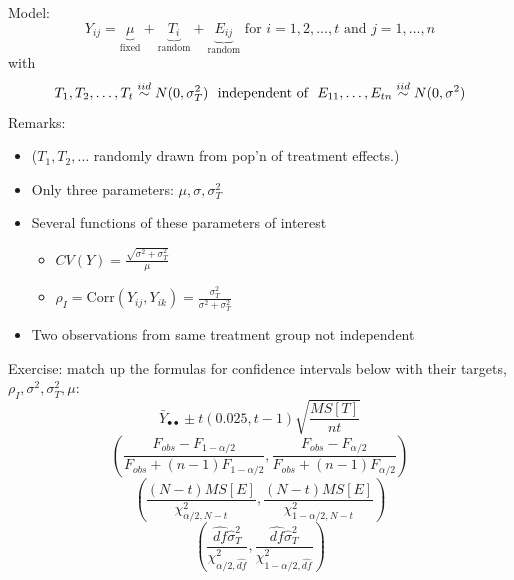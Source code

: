 Model:
$$ Y_{ij} = \underbrace{\mu}_{\text{fixed}} + \underbrace{T_i}_{\text{random}} 
+ \underbrace{E_{ij}}_{\text{random}} \text{ for }i=1,2,\ldots,t\mbox{ and }
j=1,\ldots,n$$
with
$$T_1,T_2,\ldots,T_t \stackrel{iid}{\sim} N(0,\sigma_T^2)\ \mbox{ independent of }\ E_{11},\ldots,E_{tn} \stackrel{iid}{\sim} N(0,\sigma^2)$$
\bigkn
Remarks:
\begin{itemize}
\item
($T_1,T_2,\ldots$ randomly drawn from pop'n of treatment
effects.)
\item Only three parameters: $\mu,\sigma,\sigma_T^2$
\item Several functions of these parameters of interest
\begin{itemize}
\item $CV(Y)=\frac{\sqrt{\sigma^2 + \sigma_T^2}}{\mu}$
\item $\rho_I=\mbox{Corr}(Y_{ij},Y_{ik})=\frac{\sigma_T^2}{\sigma^2 + \sigma_T^2}$
\end{itemize}
\item Two observations from same treatment group not independent
\end{itemize}
Exercise: match up the formulas for confidence intervals
below with their targets, $\rho_I,\sigma^2,\sigma_T^2,\mu$: 
$$\bar{Y}_{\bullet\bullet} \pm t(0.025,t-1) \sqrt{\frac{MS[T]}{nt}}$$
$$\left(\frac{F_{obs}-F_{1-\alpha/2}}{F_{obs}+(n-1)F_{1-\alpha/2}},\frac{F_{obs}-F_{\alpha/2}}{F_{obs}+(n-1)F_{\alpha/2}} \right)$$
$$\left(\frac{(N-t)MS[E]}{\chi^2_{\alpha/2,N-t}},\frac{(N-t)MS[E]}{\chi^2_{1-\alpha/2,N-t}}\right)$$
$$\left(\frac{\widehat{df}\hat\sigma_T^2}{\chi^2_{\alpha/2,\widehat{df}}} ,\frac{\widehat{df}\hat\sigma_T^2}{\chi^2_{1-\alpha/2,\widehat{df}}} \right)$$

